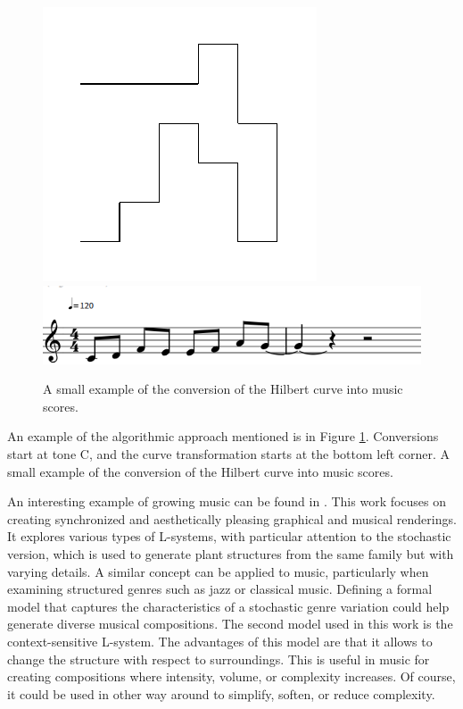 \begin{figure}[H]
\centering
\hfill
\includegraphics[scale=0.8]{obrazky-figures/lsys.pdf}
\hfill
\includegraphics[scale=0.4]{obrazky-figures/lsys.png}
\hfill
\caption{A small example of the conversion of the Hilbert curve into music scores.}
\label{lsysturtle}
\end{figure}

An example of the algorithmic approach mentioned is in Figure \ref{lsysturtle}. Conversions start at tone C, and the curve transformation starts at the bottom left corner. A small example of the conversion of the Hilbert curve into music scores.

An interesting example of growing music can be found in \cite{lsystemsmix}. This work focuses on creating synchronized and aesthetically pleasing graphical and musical renderings. It explores various types of L-systems, with particular attention to the stochastic version, which is used to generate plant structures from the same family but with varying details. A similar concept can be applied to music, particularly when examining structured genres such as jazz or classical music. Defining a formal model that captures the characteristics of a stochastic genre variation could help generate diverse musical compositions. The second model used in this work is the context-sensitive L-system. The advantages of this model are that it allows to change the structure with respect to surroundings. This is useful in music for creating compositions where intensity, volume, or complexity increases. Of course, it could be used in other way around to simplify, soften, or reduce complexity.

